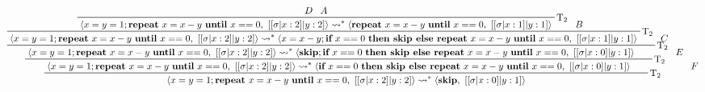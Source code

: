 \documentclass[11pt]{article}
\newcommand{\curly}{\mathrel{\leadsto}}
\begin{document}
\begin{landscape}
\begin{displaymath}
    \prftree[r]{$\mathrm{T_2}$}{
        \prftree[r]{$\mathrm{T_2}$}{
            \prftree[r]{$\mathrm{T_2}$}{
                \prftree[r]{$\mathrm{T_2}$}{
                    \prftree[r]{$\mathrm{T_2}$}{D}{A}
                    {\langle x=y=1; \textbf{repeat}\ x=x-y\ \textbf{until}\ x==0,\ [[\sigma|x:2]|y:2] \rangle \curly^* \langle \textbf{repeat}\ x=x-y\ \textbf{until}\ x==0,\ [[\sigma|x:1]|y:1] \rangle}
                }{B}
                {\langle x=y=1; \textbf{repeat}\ x=x-y\ \textbf{until}\ x==0,\ [[\sigma|x:2]|y:2] \rangle \curly^* \langle x=x-y; \textbf{if}\ x==0\ \textbf{then\ skip\ else\ repeat}\ x=x-y\ \textbf{until}\ x==0,\ [[\sigma|x:1]|y:1] \rangle}
            }{C}
            {\langle x=y=1; \textbf{repeat}\ x=x-y\ \textbf{until}\ x==0,\ [[\sigma|x:2]|y:2] \rangle \curly^* \langle \textbf{skip}; \textbf{if}\ x==0\ \textbf{then\ skip\ else\ repeat}\ x=x-y\ \textbf{until}\ x==0,\ [[\sigma|x:0]|y:1] \rangle}
        }{E}
        {\langle x=y=1; \textbf{repeat}\ x=x-y\ \textbf{until}\ x==0,\ [[\sigma|x:2]|y:2] \rangle \curly^* \langle \textbf{if}\ x==0\ \textbf{then\ skip\ else\ repeat}\ x=x-y\ \textbf{until}\ x==0,\ [[\sigma|x:0]|y:1] \rangle}
    }{F}
    {\langle x=y=1; \textbf{repeat}\ x=x-y\ \textbf{until}\ x==0,\ [[\sigma|x:2]|y:2] \rangle \curly^* \langle \textbf{skip},\ [[\sigma|x:0]|y:1] \rangle}
\end{displaymath}
\end{landscape}
\end{document}
